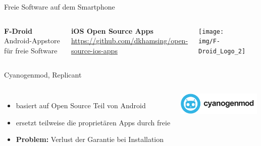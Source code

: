\documentclass[12pt, xcolor={svgnames,table}]{beamer}
\begin{document}
\begin{frame}{Freie Software auf dem Smartphone}
  \begin{columns}
    \column{6.5cm}

    \textbf{F-Droid}\\
    Android-Appstore für freie Software

    \vspace{0.5cm}

    \textbf{iOS Open Source Apps}\\
    \url{https://github.com/dkhamsing/open-source-ios-apps}

    \column{5cm}

    \begin{center}
      \texttt{[image: img/F-Droid\_Logo\_2]}
    \par\end{center}
    \begin{center}
    \par\end{center}
  \end{columns}
\end{frame}

\begin{frame}{Cyanogenmod, Replicant}
  \begin{columns}
    \column{6cm}
    \begin{itemize}
      \item basiert auf Open Source Teil von Android
      \item ersetzt teilweise die proprietären Apps durch freie
      \item \textbf{Problem:} Verlust der Garantie bei Installation
    \end{itemize}
    \column{5cm}
    \begin{center}
      \includegraphics[width=4cm]{img/cyanogenmod.png}
    \par\end{center}
  \end{columns}
\end{frame}
\end{document}
